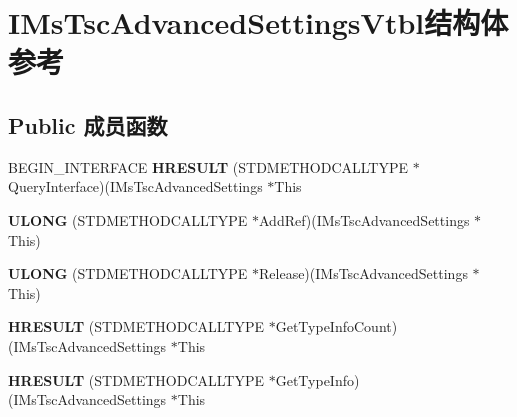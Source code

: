 \hypertarget{struct_i_ms_tsc_advanced_settings_vtbl}{}\section{I\+Ms\+Tsc\+Advanced\+Settings\+Vtbl结构体 参考}
\label{struct_i_ms_tsc_advanced_settings_vtbl}
\subsection*{Public 成员函数}
\begin{DoxyCompactItemize}
\item 
\mbox{\label{struct_i_ms_tsc_advanced_settings_vtbl_abdbfff9554e789605ae26e858aee5546}} 
B\+E\+G\+I\+N\+\_\+\+I\+N\+T\+E\+R\+F\+A\+CE {\bfseries H\+R\+E\+S\+U\+LT} (S\+T\+D\+M\+E\+T\+H\+O\+D\+C\+A\+L\+L\+T\+Y\+PE $\ast$Query\+Interface)(I\+Ms\+Tsc\+Advanced\+Settings $\ast$This
\item 
\mbox{\label{struct_i_ms_tsc_advanced_settings_vtbl_a2b7d2b8879d149873ae3a28c7c3b5ccd}} 
{\bfseries U\+L\+O\+NG} (S\+T\+D\+M\+E\+T\+H\+O\+D\+C\+A\+L\+L\+T\+Y\+PE $\ast$Add\+Ref)(I\+Ms\+Tsc\+Advanced\+Settings $\ast$This)
\item 
\mbox{\label{struct_i_ms_tsc_advanced_settings_vtbl_ad290a4f7ed10166de2d2f00cbb30eec4}} 
{\bfseries U\+L\+O\+NG} (S\+T\+D\+M\+E\+T\+H\+O\+D\+C\+A\+L\+L\+T\+Y\+PE $\ast$Release)(I\+Ms\+Tsc\+Advanced\+Settings $\ast$This)
\item 
\mbox{\label{struct_i_ms_tsc_advanced_settings_vtbl_a09af511d45e45b9cf990cfc5210b9b02}} 
{\bfseries H\+R\+E\+S\+U\+LT} (S\+T\+D\+M\+E\+T\+H\+O\+D\+C\+A\+L\+L\+T\+Y\+PE $\ast$Get\+Type\+Info\+Count)(I\+Ms\+Tsc\+Advanced\+Settings $\ast$This
\item 
\mbox{\label{struct_i_ms_tsc_advanced_settings_vtbl_a3d4e398d7ea15e02e3056c380edd74b4}} 
{\bfseries H\+R\+E\+S\+U\+LT} (S\+T\+D\+M\+E\+T\+H\+O\+D\+C\+A\+L\+L\+T\+Y\+PE $\ast$Get\+Type\+Info)(I\+Ms\+Tsc\+Advanced\+Settings $\ast$This
\item 
\mbox{\label{struct_i_ms_tsc_advanced_settings_vtbl_a269d301a3d809441e81810ffb3bd3ea8}} 

\end{DoxyCompactItemize}
